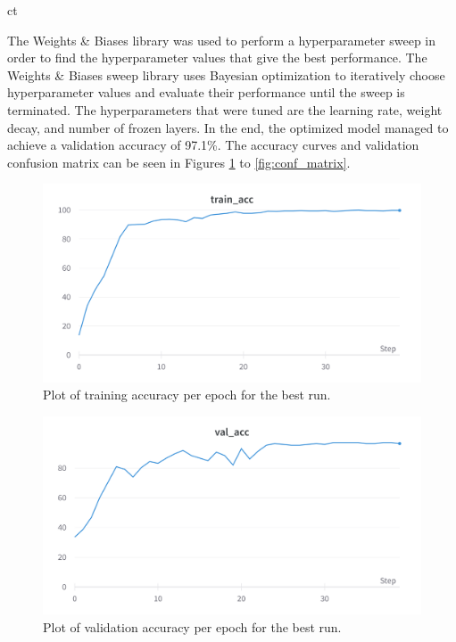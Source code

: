 ct\documentclass[a4paper,11pt]{article}
\begin{document}
The Weights \& Biases library was used to perform a hyperparameter sweep in order to find the hyperparameter values that give the best performance. The Weights \& Biases sweep library uses Bayesian optimization to iteratively choose hyperparameter values and evaluate their performance until the sweep is terminated. The hyperparameters that were tuned are the learning rate, weight decay, and number of frozen layers. In the end, the optimized model managed to achieve a validation accuracy of 97.1\%. The accuracy curves and validation confusion matrix can be seen in Figures \ref{fig:train_acc} to \ref{fig:conf_matrix}.

\begin{figure}[H]
\centering
\includegraphics[scale=0.09]{img/cv/money/train_acc.png}
\caption{Plot of training accuracy per epoch for the best run.}
\label{fig:train_acc}
\end{figure}

\begin{figure}[H]
\centering
\includegraphics[scale=0.09]{img/cv/money/val_acc.png}
\caption{Plot of validation accuracy per epoch for the best run.}
\label{fig:val_acc}
\end{figure}
\end{document}

